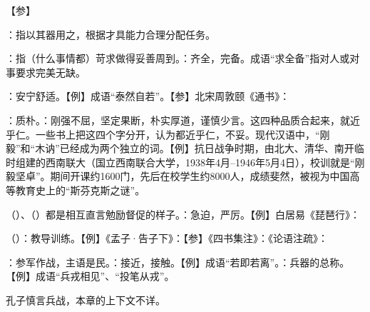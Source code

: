 {
【参】
}
{}


{
\item {}：指以其器用之，根据才具能力合理分配任务。
\item {}：指（什么事情都）苛求做得妥善周到。：齐全，完备。成语“求全备”指对人或对事要求完美无缺。
}
{}


{
\item {}：安宁舒适。【例】成语“泰然自若”。【参】北宋周敦颐《通书》：
}
{}  %


{
\item {}：质朴。：刚强不屈，坚定果断，朴实厚道，谨慎少言。这四种品质合起来，就近乎仁。一些书上把这四个字分开，认为都近乎仁，不妥。现代汉语中，“刚毅”和“木讷”已经成为两个独立的词。【例】抗日战争时期，由北大、清华、南开临时组建的西南联大（国立西南联合大学，1938年4月--1946年5月4日），校训就是“刚毅坚卓”。期间开课约1600门，先后在校学生约8000人，成绩斐然，被视为中国高等教育史上的“斯芬克斯之谜”。
}
{}


{
\item {}（）、（）都是相互直言勉励督促的样子。：急迫，严厉。【例】白居易《琵琶行》：
}
{}


{
\item {}（）：教导训练。【例】《孟子·告子下》：【参】《四书集注》：《论语注疏》：
\item {}：参军作战，主语是民。：接近，接触。【例】成语“若即若离”。：兵器的总称。【例】成语“兵戎相见”、“投笔从戎”。

孔子慎言兵战，本章的上下文不详。%
}
{}


